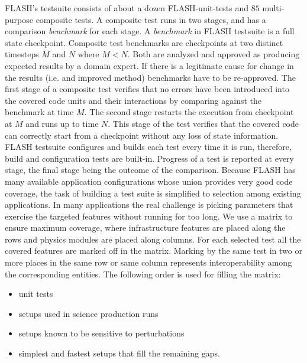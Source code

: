 FLASH's testsuite consists of about a dozen {FLASH-unit-tests} and
$85$ multi-purpose composite tests. A composite test runs in two
stages, and has a comparison {\em benchmark} for each stage. A {\em
  benchmark} in FLASH testsuite is a full state checkpoint. Composite
test benchmarks are checkpoints at two distinct timesteps $M$ and $N$ where
$M < N$. Both are analyzed and approved as producing expected results
by a domain expert. If there is a legitimate cause for change in the
results (i.e. and improved method) benchmarks have to be
re-approved. The first stage of a composite  test verifies that no
errors have been introduced into the covered code units and their interactions
by comparing against the benchmark at time $M$. The second
stage restarts the execution from checkpoint at $M$ and runs up to
time $N$. This stage of the test verifies that the covered code can
correctly start from a checkpoint without any loss of state
information. FLASH testsuite configures and builds each test every
time it is run, therefore, build and configuration tests are
built-in. Progress of a test is reported at every stage, the final
stage being the outcome of the comparison. Because FLASH has many
available application configurations whose union provides  
very good code coverage, the task of building a test suite is simplified
to selection among existing applications. In many applications the
real challenge is picking parameters that exercise the targeted
features without running for too long. We use a matrix
to ensure maximum coverage, where infrastructure features are placed
along the rows and physics modules are placed along columns. For each
selected test all the covered features are marked off in the
matrix. Marking by the same test in two or more places in the same row or
same column represents interoperability among the corresponding
entities. The following order is used for filling the matrix:
\begin{itemize}
\item unit tests
\item setups used in science production runs
\item setups known to be sensitive to perturbations
\item simplest and fastest setups that fill the remaining gaps. 
\end{itemize} 

